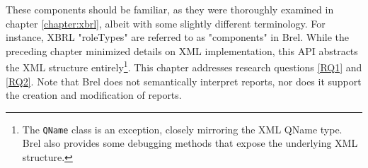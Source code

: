 These components should be familiar, as they were thoroughly examined in chapter \ref{chapter:xbrl},
albeit with some slightly different terminology. 
For instance, XBRL "roleTypes" are referred to as "components" in Brel.
While the preceding chapter minimized details on XML implementation, this API abstracts the XML structure entirely\footnote{The \texttt{QName} class is an exception, closely mirroring the XML QName type. Brel also provides some debugging methods that expose the underlying XML structure.}.
This chapter addresses research questions \ref{RQ1} and \ref{RQ2}.
Note that Brel does not semantically interpret reports, 
nor does it support the creation and modification of reports.
